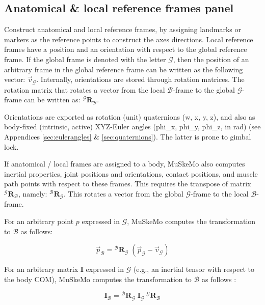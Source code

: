 \documentclass{article}
\begin{document}
\subsection{Anatomical \& local reference frames panel}

Construct anatomical and local reference frames, by assigning landmarks or markers as the reference points to construct the axes directions. Local reference frames have a position and an orientation with respect to the global reference frame. If the global frame is denoted with the letter \(\mathcal{G}\), then the position of an arbitrary frame in the global reference frame can be written as the following vector: \(\vec{v}_{\mathcal{G}}\). Internally, orientations are stored through rotation matrices. The rotation matrix that rotates a vector from the local \(\mathcal{B}\)-frame to the global \(\mathcal{G}\)-frame can be written as: \({}^{\mathcal{G}} \mathbf{R}_{\mathcal{B}}\).

Orientations are exported as rotation (unit) quaternions (w, x, y, z), and also as body-fixed (intrinsic, active) XYZ-Euler angles (phi\_x, phi\_y, phi\_z, in rad) (see Appendices \ref{sec:eulerangles} \& \ref{sec:quaternions}). The latter is prone to gimbal lock. 

If anatomical / local frames are assigned to a body, MuSkeMo also computes inertial properties, joint positions and orientations, contact positions, and muscle path points with respect to these frames. This requires the transpose of matrix \({}^{\mathcal{G}} \mathbf{R}_{\mathcal{B}}\), namely: \({}^{\mathcal{B}} \mathbf{R}_{\mathcal{G}}\). This rotates a vector from the global \(\mathcal{G}\)-frame to the local \(\mathcal{B}\)-frame.

For an arbitrary point \(p\) expressed in \(\mathcal{G}\), MuSkeMo computes the transformation to \(\mathcal{B}\) as follows: 

\begin{equation}
\vec{p}_{\mathcal{B}} = {}^{\mathcal{B}} \mathbf{R}_{\mathcal{G}} \; (\vec{p}_{\mathcal{G}} - \vec{v}_{\mathcal{G}})
\end{equation}

For an arbitrary matrix \(\mathbf{I}\) expressed in \(\mathcal{G}\) (e.g., an inertial tensor with respect to the body COM), MuSkeMo computes the transformation to \(\mathcal{B}\) as follows \cite{valleryAdvancedDynamics2019}:

\begin{equation}
\mathbf{I}_{\mathcal{B}} = {}^{\mathcal{B}} \mathbf{R}_{\mathcal{G}} \;\mathbf{I}_{\mathcal{G}} \; {}^{\mathcal{G}} \mathbf{R}_{\mathcal{B}}
\label{eq:changeofbasis}
\end{equation}
\end{document}
